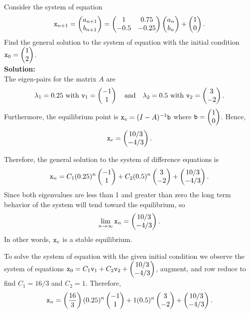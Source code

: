 \begin{example}
Consider the system of equation 
\[ \texttt{x}_{n+1} = \begin{pmatrix} a_{n+1} \\ b_{n+1} \end{pmatrix} = \begin{pmatrix} 1 & 0.75 \\ -0.5 & -0.25 \end{pmatrix} \begin{pmatrix} a_n
\\ b_n \end{pmatrix} + \begin{pmatrix} 1 \\ 0 \end{pmatrix}. \]
Find the general solution to the system of equation with the initial condition $\texttt{x}_0 =
\begin{pmatrix} 1 \\ 2 \end{pmatrix}$.
\\{\bf Solution:}\\
The eigen-pairs for the matrix $A$ are
\[ \lambda_1 = 0.25 \text{ with } \texttt{v}_1 = \begin{pmatrix} -1\\1\end{pmatrix} \quad \text{and} \quad \lambda_2
= 0.5 \text{ with } \texttt{v}_2 = \begin{pmatrix} 3 \\ -2 \end{pmatrix}. \]
Furthermore, the equilibrium point is $\texttt{x}_e = (I-A)^{-1} \texttt{b}$ where $\texttt{b} = \begin{pmatrix} 1
\\ 0 \end{pmatrix}$.  Hence,
\[ \texttt{x}_e = \begin{pmatrix} 10/3 \\ -4/3 \end{pmatrix}. \]

Therefore, the general solution to the system of difference equations is
\[ \texttt{x}_n = C_1 (0.25)^n \begin{pmatrix} -1 \\ 1 \end{pmatrix} + C_2 (0.5)^n \begin{pmatrix} 3 \\ -2 \end{pmatrix} + \begin{pmatrix} 10/3 \\
-4/3 \end{pmatrix}. \]
Since both eigenvalues are less than 1 and greater than zero the long term behavior of the
system will tend toward the equilibrium, so
\[ \lim_{n \to \infty} \texttt{x}_n = \begin{pmatrix} 10/3 \\ -4/3 \end{pmatrix}. \]
In other words, $\texttt{x}_e$ is a stable equilibrium.

To solve the system of equation with the given initial condition we observe the system of
equations $\texttt{x}_0 = C_1 \texttt{v}_1 + C_2 \texttt{v}_2 + \begin{pmatrix} 10/3 \\ -4/3 \end{pmatrix}$, augment, and row
reduce to find $C_1=16/3$ and
$C_2=1$.  Therefore,
\[ \texttt{x}_n = \left( \frac{16}{3} \right) (0.25)^n \begin{pmatrix} -1 \\ 1 \end{pmatrix} + 1 (0.5)^n \begin{pmatrix} 3 \\ -2 \end{pmatrix} + \begin{pmatrix} 10/3 \\
-4/3 \end{pmatrix}. \]
\end{example}

